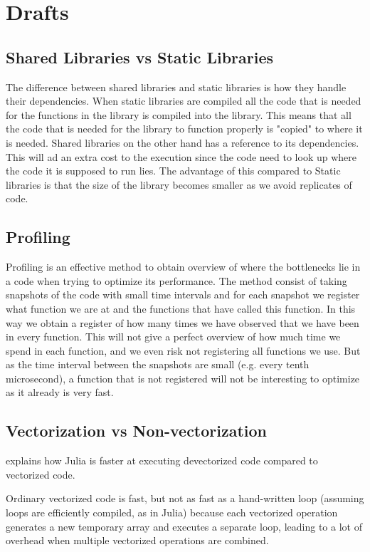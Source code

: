 \chapter{Drafts}
\section{Shared Libraries vs Static Libraries}
The difference between shared libraries and static libraries is how they handle their dependencies. When static libraries are compiled all the code that is needed for the functions in the library is compiled into the library. This means that all the code that is needed for the library to function properly is "copied" to where it is needed. Shared libraries on the other hand has a reference to its dependencies. This will ad an extra cost to the execution since the code need to look up where the code it is supposed to run lies. The advantage of this compared to Static libraries is that the size of the library becomes smaller as we avoid replicates of code.

\section{Profiling}
Profiling is an effective method to obtain overview of where the bottlenecks lie in a code when trying to optimize its performance. The method consist of taking snapshots of the code with small time intervals and for each snapshot we register what function we are at and the functions that have called this function. In this way we obtain a register of how many times we have observed that we have been in every function. This will not give a perfect overview of how much time we spend in each function, and we even risk not registering all functions we use. But as the time interval between the snapshots are small (e.g. every tenth microsecond), a function that is not registered will not be interesting to optimize as it already is very fast. 

\section{Vectorization vs Non-vectorization}
\emph{\citep{Vectorization}} explains how Julia is faster at executing devectorized code compared to vectorized code.

\emph{\citep{Dot_vectorization}}
Ordinary vectorized code is fast, but not as fast as a hand-written loop (assuming loops are efficiently compiled, as in Julia) because each vectorized operation generates a new temporary array and executes a separate loop, leading to a lot of overhead when multiple vectorized operations are combined.